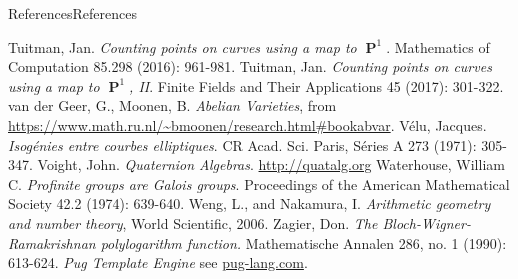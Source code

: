\documentclass[10pt,]{book}
\numberwithin{equation}{section}
\DeclareMathOperator{\PP}{\mathbf{P}}
\begin{document}
\begin{references-chapter-numberless}{References}{}{References}{}{}
\begin{thebibliography}{9}
\hypertarget{bib-tuitman-map-to-p1-1}{}Tuitman, Jan. \textit{Counting points on curves using a map to \(\PP^1\)}. Mathematics of Computation 85.298 (2016): 961-981.
\hypertarget{bib-tuitman-map-to-p1-2}{}Tuitman, Jan. \textit{Counting points on curves using a map to \(\PP^1\), II}. Finite Fields and Their Applications 45 (2017): 301-322.
\hypertarget{bib-vandergeer-moonen}{}van der Geer, G., Moonen, B. \textit{Abelian Varieties}, from \url{https://www.math.ru.nl/\~bmoonen/research.html\#bookabvar}.
\hypertarget{bib-velu}{}Vélu, Jacques. \textit{Isogénies entre courbes elliptiques}. CR Acad. Sci. Paris, Séries A 273 (1971): 305-347.
\hypertarget{bib-voight-quat}{}Voight, John. \textit{Quaternion Algebras}. \url{http://quatalg.org}
\hypertarget{bib-waterhouse}{}Waterhouse, William C.  \textit{Profinite groups are Galois groups}. Proceedings of the American Mathematical Society 42.2 (1974): 639-640.
\hypertarget{bib-weng-nakamura}{}Weng, L., and Nakamura, I. \textit{Arithmetic geometry and number theory}, World Scientific, 2006.
\hypertarget{bib-zag-ram}{}Zagier, Don.  \textit{The Bloch-Wigner-Ramakrishnan polylogarithm function.} Mathematische Annalen 286, no. 1 (1990): 613-624.
\hypertarget{bib-pug}{}\textit{Pug Template Engine} see \href{http://pug-lang.com/}{pug-lang.com}.
\end{thebibliography}
\end{references-chapter-numberless}
\end{document}
